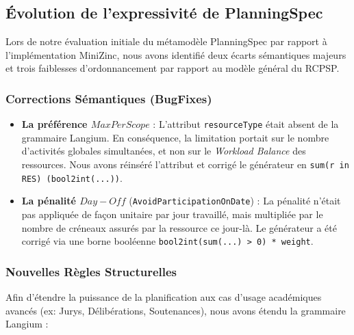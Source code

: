 \subsection{Évolution de l'expressivité de PlanningSpec}

Lors de notre évaluation initiale du métamodèle PlanningSpec par rapport à l'implémentation MiniZinc, nous avons identifié deux écarts sémantiques majeurs et trois faiblesses d'ordonnancement par rapport au modèle général du RCPSP. 

\subsubsection{Corrections Sémantiques (BugFixes)}
\begin{itemize}
    \item \textbf{La préférence $MaxPerScope$} : L'attribut \texttt{resourceType} était absent de la grammaire Langium. En conséquence, la limitation portait sur le nombre d'activités globales simultanées, et non sur le \textit{Workload Balance} des ressources. Nous avons réinséré l'attribut et corrigé le générateur en \texttt{sum(r in RES) (bool2int(...))}.
    \item \textbf{La pénalité $Day-Off$} (\texttt{AvoidParticipationOnDate}) : La pénalité n'était pas appliquée de façon unitaire par jour travaillé, mais multipliée par le nombre de créneaux assurés par la ressource ce jour-là. Le générateur a été corrigé via une borne booléenne \texttt{bool2int(sum(...) > 0) * weight}.
\end{itemize}

\subsubsection{Nouvelles Règles Structurelles}
Afin d'étendre la puissance de la planification aux cas d'usage académiques avancés (ex: Jurys, Délibérations, Soutenances), nous avons étendu la grammaire Langium :

